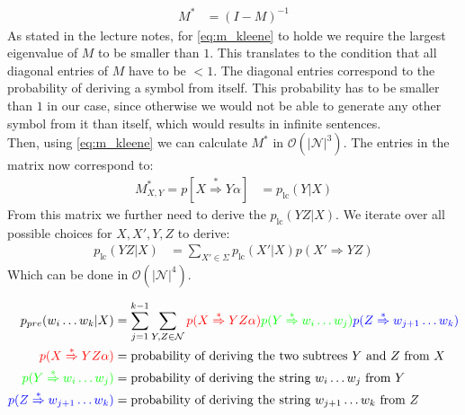 \documentclass[a4paper,12pt]{ETHexercise}
\begin{document}
\begin{question}
\begin{subquestion}
\begin{align}
			M^*         & = (I - M)^{-1} \label{eq:m_kleene}
		\end{align}
		As stated in the lecture notes, for \cref*{eq:m_kleene} to holde we require the largest eigenvalue of $M$ to be smaller than $1$. This translates to the condition that all diagonal entries of $M$ have to be $< 1$. The diagonal entries correspond to the probability of deriving a symbol from itself. This probability has to be smaller than $1$ in our case, since otherwise we would not be able to generate any other symbol from it than itself, which would results in infinite sentences.\\
		Then, using \cref{eq:m_kleene} we can calculate $M^*$ in $\mathcal{O}(|\mathcal{N}|^3)$. The entries in the matrix now correspond to:
		\begin{align}
			M^*_{X,Y} = p[X \overset{*}{\Rightarrow} Y\alpha] & = p_{\text{lc}}(Y | X)
		\end{align}
		From this matrix we further need to derive the $p_{\text{lc}}(YZ | X)$. We iterate over all possible choices for $X, X',Y,Z$ to derive:
		\begin{align}
			p_{\text{lc}}(YZ | X) & = \sum_{X' \in \Sigma} p_{\text{lc}}(X' | X) p(X' \Rightarrow YZ) \label{eq:lc}
		\end{align}
		Which can be done in $\mathcal{O}(|\mathcal{N}|^4)$.
	\end{subquestion}
	\begin{subquestion}
		\begin{align}
			p_{pre}(w_i \dots w_k | X)                                    & = \sum_{j=1}^{k-1} \sum_{Y,Z \in \mathcal{N}} {\color{red} p(X \overset{*}{\Rightarrow} YZ\alpha)}{\color{green}p(Y \overset{*}{\Rightarrow} w_i \dots w_j)}{\color{blue} p(Z \overset{*}{\Rightarrow} w_{j+1} \dots w_k)} \label{eq:pre} \\
			{\color{red}p(X \overset{*}{\Rightarrow} YZ\alpha)}           & = \text{probability of deriving the two subtrees $Y$ and $Z$ from $X$} \label{eq:pre2}                                                                                                                                                    \\
			{\color{green}p(Y \overset{*}{\Rightarrow} w_i \dots w_j)}    & = \text{probability of deriving the string $w_i \dots w_j$ from $Y$} \label{eq:pre3}                                                                                                                                                      \\
			{\color{blue}p(Z \overset{*}{\Rightarrow} w_{j+1} \dots w_k)} & = \text{probability of deriving the string $w_{j+1} \dots w_k$ from $Z$} \label{eq:pre4}                                                                                                                                                  \\

\end{align}
\end{subquestion}
\end{question}
\end{document}
